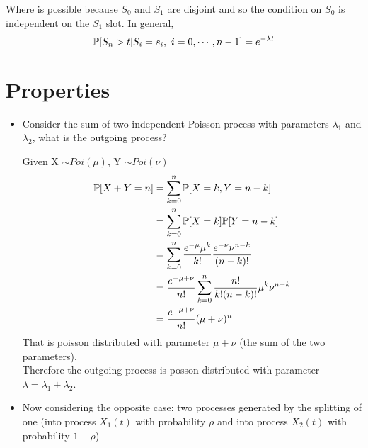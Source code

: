 Where  is possible because $S_0$ and $S_1$ are disjoint and so the condition on $S_0$ is independent on the $S_1$ slot.
In general,
\begin{equation}
	\mathbb{P}[S_n > t | S_i = s_i, ~i=0,\cdots,n-1] = e^{-\lambda t}
\end{equation}

\section{Properties}
	\begin{itemize}
		\item Consider the sum of two independent Poisson process with parameters $\lambda_1$ and $\lambda_2$, what is the outgoing process?
		\begin{figure}[H]
			\centering
		\end{figure}
		Given X $\sim Poi(\mu)$, Y $\sim Poi(\nu)$
		\begin{equation}
			\begin{split}
				 \mathbb{P}[X + Y = n] &=	\sum\limits_{k=0}^n \mathbb{P}[X = k, Y = n - k] \\
				 &=	\sum\limits_{k=0}^n \mathbb{P}[X = k] \mathbb{P}[Y = n - k] \\
				 &=	\sum\limits_{k=0}^n \frac{e^{-\mu} \mu^k}{k!} \frac{e^{-\nu}\nu^{n-k}}{(n-k)!}\\
				 &=	\frac{e^{-\mu + \nu}}{n!}\sum\limits_{k=0}^n \frac{n!}{k!(n-k)!}\mu^k\nu^{n-k}\\
				 &=	\frac{e^{-\mu + \nu}}{n!}(\mu + \nu)^n
			 \end{split}
		\end{equation}
		That is poisson distributed with parameter $\mu + \nu$ (the sum of the two parameters). \\
		 Therefore the outgoing process is posson distributed with parameter $\lambda = \lambda_1 + \lambda_2$.
		\item Now considering the opposite case: two processes generated by the splitting of one (into process $X_1(t)$ with probability $\rho$ and into process $X_2(t)$ with probability $1-\rho$)

\end{itemize}
